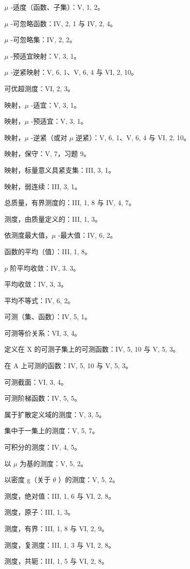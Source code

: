 \(\mu\) -适度（函数、子集）：V, 1, 2。

\(\mu\) -可忽略函数：IV, 2, 1 与 IV, 2, 4。

\(\mu\) -可忽略集：IV, 2, 2。

\(\mu\) -预适宜映射：V, 3, 1。

\(\mu\) -逆紧映射：V, 6, 1、V, 6, 4 与 VI, 2, 10。

可优超测度：VI, 2, 3。

映射，\(\mu\) -适宜：V, 3, 1。

映射，\(\mu\) -预适宜：V, 3, 1。

映射，\(\mu\) -逆紧（或对 \(\mu\) 逆紧）：V, 6, 1、V, 6, 4 与 VI, 2, 10。

映射，保守：V, 7，习题 9。

映射，标量意义具紧支集：III, 3, 1。

映射，弱连续：III, 3, 1。

总质量，有界测度的：III, 1, 8 与 IV, 4, 7。

测度，由质量定义的：III, 1, 3。

依测度最大值，\(\mu\) -最大值：IV, 6, 2。

函数的平均（值）：III, 1, 8。

\(p\) 阶平均收敛：IV, 3. 3。

平均收敛：IV, 3, 3。

平均不等式：IV, 6, 2。

可测（集、函数）：IV, 5, 1。

可测等价关系：VI, 3, 4。

定义在 X 的可测子集上的可测函数：IV, 5, 10 与 V, 5, 3。

在 A 上可测的函数：IV, 5, 10 与 V, 5, 3。

可测截面：VI, 3, 4。

可测阶梯函数：IV, 5, 5。

属于扩散定义域的测度：V, 3, 5。

集中于一集上的测度：V, 5, 7。

可积分的测度：IV, 4, 5。

以 \(\mu\) 为基的测度：V, 5, 2。

以密度 g（关于 \(\theta\) ）的测度：V, 5, 2。

测度，绝对值：III, 1, 6 与 VI, 2, 8。

测度，原子：III, 1, 3。

测度，有界：III, 1, 8 与 VI, 2, 9。

测度，复测度：III, 1, 3 与 VI, 2, 8。

测度，共轭：III, 1, 5 与 VI, 2, 8。

